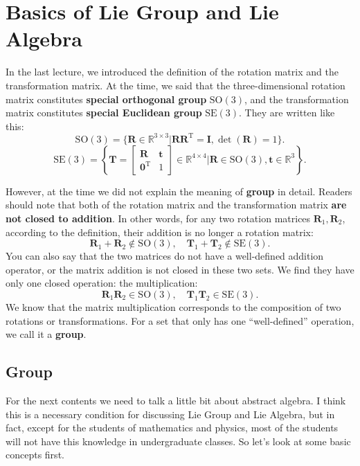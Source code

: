 \section{Basics of Lie Group and Lie Algebra}
In the last lecture, we introduced the definition of the rotation matrix and the transformation matrix. At the time, we said that the three-dimensional rotation matrix constitutes \textbf{special orthogonal group} $\mathrm{SO}(3)$, and the transformation matrix constitutes \textbf{special Euclidean group} $\mathrm{SE}(3) $. They are written like this:
\begin{equation}
\mathrm{SO}(3) = \{ \mathbf{R} \in \mathbb{R}^{3 \times 3} | \mathbf{RR}^\mathrm{T} = \mathbf{I}, \det(\mathbf{R})=1 \}.
\end{equation}
\begin{equation}
\mathrm{SE}(3) = \left\{ \mathbf{T} = \left[ {\begin{array}{*{20}{c}}
    \mathbf{R} & \mathbf{t} \\
    {{\mathbf{0}^\mathrm{T}}} & 1
    \end{array}} \right]
\in \mathbb{R}^{4 \times 4} | \mathbf{R} \in \mathrm{SO}(3), \mathbf{t} \in \mathbb{R}^3\right\}.
\end{equation}

However, at the time we did not explain the meaning of \textbf{group} in detail. Readers should note that both of the rotation matrix and the transformation matrix \textbf{are not closed to addition}. In other words, for any two rotation matrices $\mathbf{R}_1, \mathbf{R}_2$, according to the definition, their addition is no longer a rotation matrix:
\begin{equation}
\mathbf{R}_1 + \mathbf{R}_2 \notin \mathrm{SO}(3), \quad \mathbf{T}_1 + \mathbf{T}_2 \notin \mathrm{SE}(3).
\end{equation}
You can also say that the two matrices do not have a well-defined addition operator, or the matrix addition is not closed in these two sets. We find they have only one closed operation: the multiplication:
\begin{equation}
\mathbf{R}_1 \mathbf{R}_2 \in \mathrm{SO}(3), \quad \mathbf{T}_1 \mathbf{T}_2 \in \mathrm{SE}(3).
\end{equation}
We know that the matrix multiplication corresponds to the composition of two rotations or transformations. For a set that only has one ``well-defined'' operation, we call it a \textbf{group}.

\subsection{Group}
For the next contents we need to talk a little bit about abstract algebra. I think this is a necessary condition for discussing Lie Group and Lie Algebra, but in fact, except for the students of mathematics and physics, most of the students will not have this knowledge in undergraduate classes. So let's look at some basic concepts first.

